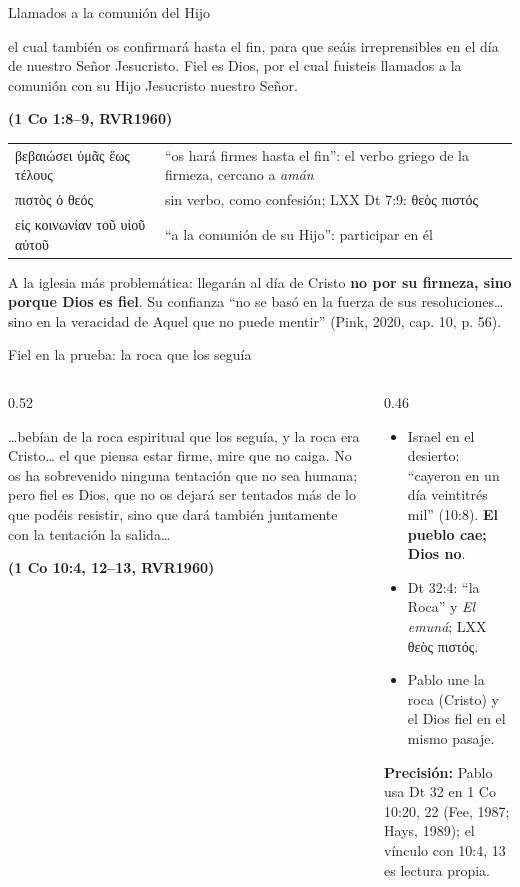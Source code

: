 \documentclass[hyperref={bookmarks=false},aspectratio=169]{beamer}
\newcommand{\grc}[1]{\foreignlanguage{ancientgreek}{#1}}
\newcommand{\fuente}[1]{\par\hfill{\upshape\bfseries\footnotesize\textcolor{azul}{#1}}}
\newcommand{\destacar}[1]{\textbf{\textcolor{azul}{#1}}}
\newcommand{\precision}[1]{{\footnotesize\color{gris}\textbf{Precisión:} #1}}
\begin{document}
\begin{frame}{Llamados a la comunión del Hijo}
\begin{cita}el cual también os confirmará hasta el fin, para que seáis irreprensibles en el día de nuestro Señor Jesucristo. Fiel es Dios, por el cual fuisteis llamados a la comunión con su Hijo Jesucristo nuestro Señor.\fuente{(1 Co 1:8--9, RVR1960)}\end{cita}
\scriptsize\renewcommand{\arraystretch}{1.12}
\begin{tabular}{@{}>{\RaggedRight\arraybackslash}p{3.4cm}>{\RaggedRight\arraybackslash}p{8.4cm}@{}}
\toprule
\grc{βεβαιώσει ὑμᾶς ἕως τέλους} & ``os hará firmes hasta el fin'': el verbo griego de la firmeza, cercano a \emph{amán} \\
\grc{πιστὸς ὁ θεός} & sin verbo, como confesión; LXX Dt 7:9: \grc{θεὸς πιστός} \\
\grc{εἰς κοινωνίαν τοῦ υἱοῦ αὐτοῦ} & ``a la comunión de su Hijo'': participar en él \\
\bottomrule
\end{tabular}\par\medskip
\small A la iglesia más problemática: llegarán al día de Cristo \destacar{no por su firmeza, sino porque Dios es fiel}. Su confianza ``no se basó en la fuerza de sus resoluciones\ldots{} sino en la veracidad de Aquel que no puede mentir'' (Pink, 2020, cap. 10, p. 56).
\end{frame}

\begin{frame}{Fiel en la prueba: la roca que los seguía}
\begin{columns}[t,onlytextwidth]
\begin{column}{0.52\textwidth}
\begin{cita}\ldots{}bebían de la roca espiritual que los seguía, y la roca era Cristo\ldots{} el que piensa estar firme, mire que no caiga. No os ha sobrevenido ninguna tentación que no sea humana; pero fiel es Dios, que no os dejará ser tentados más de lo que podéis resistir, sino que dará también juntamente con la tentación la salida\ldots\fuente{(1 Co 10:4, 12--13, RVR1960)}\end{cita}
\end{column}
\begin{column}{0.46\textwidth}\small
\begin{itemize}
\item Israel en el desierto: ``cayeron en un día veintitrés mil'' (10:8). \destacar{El pueblo cae; Dios no}.
\item Dt 32:4: ``la Roca'' y \emph{El emuná}; LXX \grc{θεὸς πιστός}.
\item Pablo une la roca (Cristo) y el Dios fiel en el mismo pasaje.
\end{itemize}
\precision{Pablo usa Dt 32 en 1 Co 10:20, 22 (Fee, 1987; Hays, 1989); el vínculo con 10:4, 13 es lectura propia.}
\end{column}
\end{columns}
\end{frame}
\end{document}
